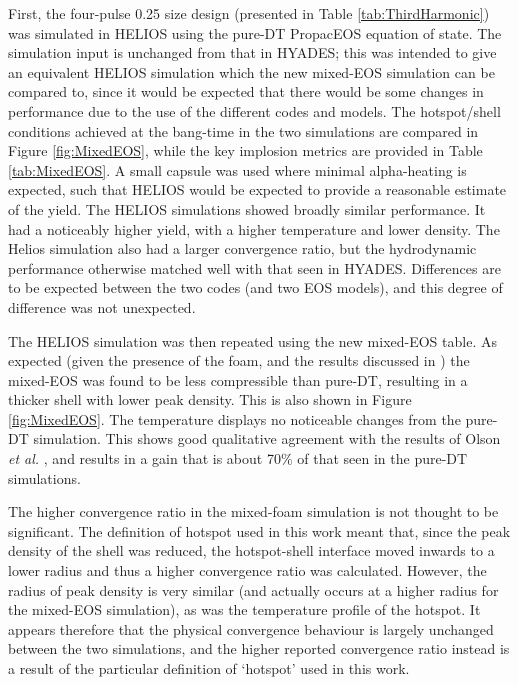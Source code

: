 First, the four-pulse 0.25 size design (presented in Table \ref{tab:ThirdHarmonic}) was simulated in HELIOS using the pure-DT PropacEOS equation of state. The simulation input is unchanged from that in HYADES; this was intended to give an equivalent HELIOS simulation which the new mixed-EOS simulation can be compared to, since it would be expected that there would be some changes in performance due to the use of the different codes and models. The hotspot/shell conditions achieved at the bang-time in the two simulations are compared in Figure \ref{fig:MixedEOS}, while the key implosion metrics are provided in Table \ref{tab:MixedEOS}. A small capsule was used where minimal alpha-heating is expected, such that HELIOS would be expected to provide a reasonable estimate of the yield. The HELIOS simulations showed broadly similar performance. It had a noticeably higher yield, with a higher temperature and lower density. The Helios simulation also had a larger convergence ratio, but the hydrodynamic performance otherwise matched well with that seen in HYADES. Differences are to be expected between the two codes (and two EOS models), and this degree of difference was not unexpected.

The HELIOS simulation was then repeated using the new mixed-EOS table. As expected (given the presence of the foam, and the results discussed in \cite{Olson2021}) the mixed-EOS was found to be less compressible than pure-DT, resulting in a thicker shell with lower peak density. This is also shown in Figure \ref{fig:MixedEOS}. The temperature displays no noticeable changes from the pure-DT simulation. This shows good qualitative agreement with the results of Olson \textit{et al.} \cite{Olson2020a}, and results in a gain that is about 70\% of that seen in the pure-DT simulations.

The higher convergence ratio in the mixed-foam simulation is not thought to be significant. The definition of hotspot used in this work meant that, since the peak density of the shell was reduced, the hotspot-shell interface moved inwards to a lower radius and thus a higher convergence ratio was calculated. However, the radius of peak density is very similar (and actually occurs at a higher radius for the mixed-EOS simulation), as was the temperature profile of the hotspot. It appears therefore that the physical convergence behaviour is largely unchanged between the two simulations, and the higher reported convergence ratio instead is a result of the particular definition of `hotspot' used in this work.

